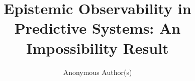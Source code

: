 \documentclass[sigplan,10pt,anonymous,screen]{acmart}
\title{Epistemic Observability in Predictive Systems: An Impossibility Result}
\author{Anonymous Author(s)}
\affiliation{%
  \institution{Anonymous Institution}
  \country{}}
\theoremstyle{remark}
\begin{document}


\maketitle
\pagestyle{plain}










\begin{acks}
\end{acks}


\clearpage


\end{document}
